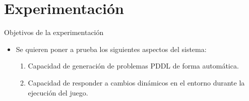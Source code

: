 \documentclass[11pt]{beamer}    %
\begin{document}
    \section{Experimentación}
    \begin{frame}{Objetivos de la experimentación}
        \begin{itemize}
            \item Se quieren poner a prueba los siguientes aspectos del sistema:
            \begin{enumerate}
                \item Capacidad de generación de problemas PDDL de forma automática.
                \item Capacidad de responder a cambios dinámicos en el entorno durante
                la ejecución del juego.
            \end{enumerate}
        \end{itemize}
    \end{frame}
\end{document}

